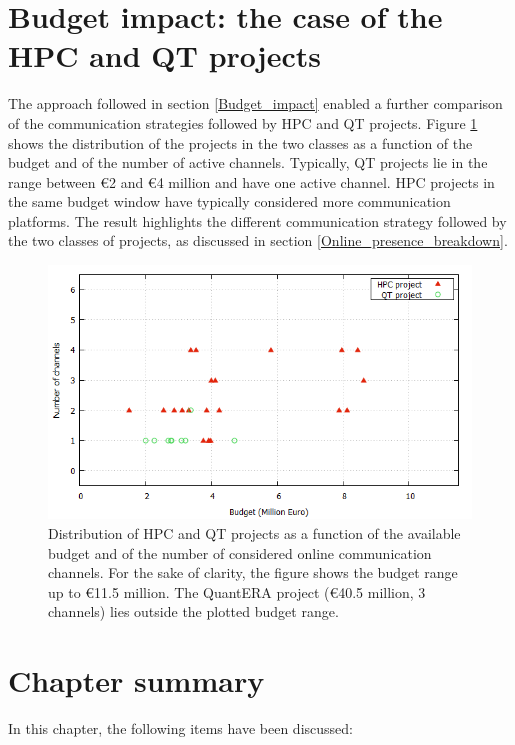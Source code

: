 \section{Budget impact: the case of the HPC and QT projects} \label{Budget_impact_the_case_of_the_HPC_and_QT_projects}
The approach followed in section \ref{Budget_impact} enabled a further comparison of the communication strategies followed by HPC and QT projects. Figure \ref{Channel_budget_breakdown} shows the distribution of the projects in the two classes as a function of the budget and of the number of active channels. Typically, QT projects lie in the range between \euro 2 and \euro 4 million and have one active channel. HPC projects in the same budget window have typically considered more communication platforms. The result highlights the different communication strategy followed by the two classes of projects, as discussed in section \ref{Online_presence_breakdown}. 

\begin{figure}[!t] 
 \begin{center}
 \includegraphics[scale=0.5]{Images/Channel_budget_breakdown.png}
 \caption{Distribution of HPC and QT projects as a function of the available budget and of the number of considered online communication channels. For the sake of clarity, the figure shows the budget range up to \euro 11.5 million. The QuantERA project (\euro 40.5 million, 3 channels) lies outside the plotted budget range.}
 \label{Channel_budget_breakdown}
 \end{center}
\end{figure}

\section{Chapter summary} 
In this chapter, the following items have been discussed:

